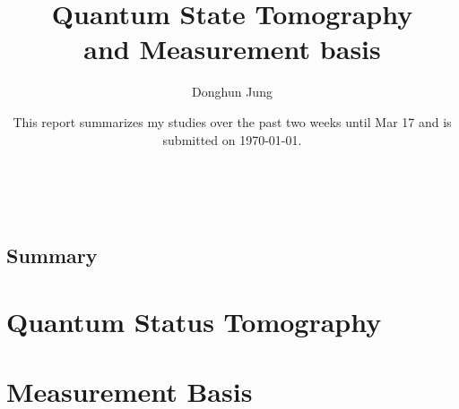 \documentclass[12pt, oneside]{book}
\author{Donghun Jung}
\title{Quantum State Tomography \\ and Measurement basis}
\subtitle{}
\date{This report summarizes my studies over the past two weeks until Mar 17 and is submitted on \today.}
\renewcommand{\headrulewidth}{0pt}
\newcommand\mymainpagestyle{%
\fancyhf{}      
\fancyhead[L]{\nouppercase{\footnotesize{\chaptername~ \thechapter~ |~ \leftmark}} \renewcommand{\headrulewidth}{0.4pt} \headrule \renewcommand{\headrulewidth}{0pt}}
\setlength{\headheight}{25pt}
\fancyfoot[C]{\thepage}
}
\begin{document}


\maketitle
\frontmatter %
\pagestyle{plain} %

\newpage \ \newpage %

\section*{Summary}
\label{sec:summary}


% 

\newpage
\tableofcontents
\newpage

 
\newpage


\mainmatter 
\mymainpagestyle{} %

% 

\chapter{Quantum Status Tomography}
\label{chap:chap1}


\chapter{Measurement Basis}
\label{chap:chap2}

\end{document}
